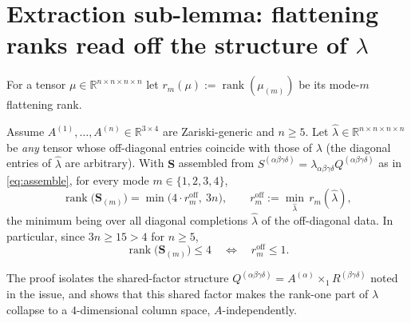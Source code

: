 \section{Extraction sub-lemma: flattening ranks read off the structure of $\lambda$}

For a tensor $\mu\in\mathbb R^{n\times n\times n\times n}$ let
$r_m(\mu):=\operatorname{rank}(\mu_{(m)})$ be its mode-$m$ flattening rank.

\begin{theorem}\label{thm:extract}
Assume $A^{(1)},\dots,A^{(n)}\in\mathbb R^{3\times4}$ are Zariski-generic and $n\ge5$.
Let $\widehat\lambda\in\mathbb R^{n\times n\times n\times n}$ be \emph{any} tensor whose
off-diagonal entries coincide with those of $\lambda$ (the diagonal entries of
$\widehat\lambda$ are arbitrary). With $\mathbf S$ assembled from
$S^{(\alpha\beta\gamma\delta)}=\lambda_{\alpha\beta\gamma\delta}Q^{(\alpha\beta\gamma\delta)}$
as in \eqref{eq:assemble}, for every mode $m\in\{1,2,3,4\}$,
\begin{equation}\label{eq:rankid}
\operatorname{rank}\big(\mathbf S_{(m)}\big)
=\min\!\Big(4\cdot r_m^{\mathrm{off}},\ 3n\Big),
\qquad
r_m^{\mathrm{off}}:=\min_{\widehat\lambda}\,r_m(\widehat\lambda),
\end{equation}
the minimum being over all diagonal completions $\widehat\lambda$ of the off-diagonal
data. In particular, since $3n\ge15>4$ for $n\ge5$,
\begin{equation}\label{eq:le4}
\operatorname{rank}\big(\mathbf S_{(m)}\big)\le4
\quad\Longleftrightarrow\quad
r_m^{\mathrm{off}}\le1 .
\end{equation}
\end{theorem}

The proof isolates the shared-factor structure
$Q^{(\alpha\beta\gamma\delta)}=A^{(\alpha)}\times_1R^{(\beta\gamma\delta)}$ noted in the
issue, and shows that this shared factor makes the rank-one part of $\lambda$ collapse to
a $4$-dimensional column space, $A$-independently.

